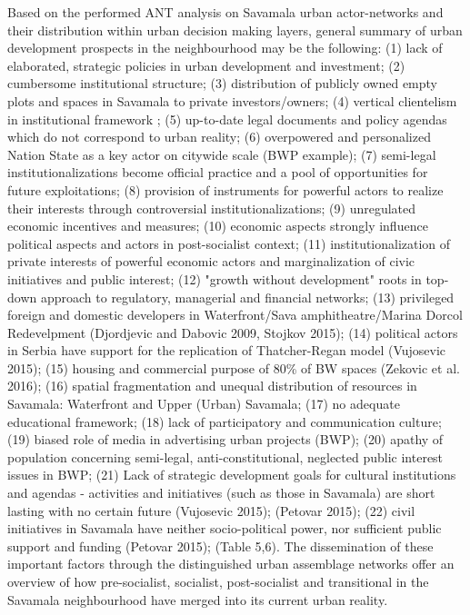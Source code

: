 \documentclass[11pt]{report}
\begin{document}
Based on the performed ANT analysis on Savamala urban actor-networks and their distribution within urban decision making layers, general summary of urban development prospects in the neighbourhood may be the following:
(1) lack of elaborated, strategic policies in urban development and investment;
(2) cumbersome institutional structure;
(3) distribution of publicly owned empty plots and spaces in Savamala to private investors/owners;
(4) vertical clientelism in institutional framework \cite{(Vujovic and Petrovic 2007)};
(5) up-to-date legal documents and policy agendas which do not correspond to urban reality;
(6) overpowered and personalized Nation State as a key actor on citywide scale (BWP example);
(7) semi-legal institutionalizations become official practice and a pool of opportunities for future exploitations;
(8) provision of instruments for powerful actors to realize their interests through controversial institutionalizations; (9) unregulated economic incentives and measures;
(10) economic aspects strongly influence political aspects and actors in post-socialist context;
(11) institutionalization of private interests of powerful economic actors and marginalization of civic initiatives and public interest;
(12) "growth without development" \cite{(Vujosevic and Maricic 2012)} roots in top-down approach to regulatory, managerial and financial networks;
(13) privileged foreign and domestic developers in Waterfront/Sava amphitheatre/Marina Dorcol Redevelpment (Djordjevic and Dabovic 2009, Stojkov 2015);
(14) political actors in Serbia have support for the replication of Thatcher-Regan model (Vujosevic 2015);
(15) housing and commercial purpose of 80\% of BW spaces (Zekovic et al. 2016); 
(16) spatial fragmentation and unequal distribution of resources in Savamala: Waterfront and Upper (Urban) Savamala; (17) no adequate educational framework;
(18) lack of participatory and communication culture;
(19) biased role of media in advertising urban projects (BWP);
(20) apathy of population concerning semi-legal, anti-constitutional, neglected public interest issues in BWP;
(21) Lack of strategic development goals for cultural institutions and agendas - activities and initiatives (such as those in Savamala) are short lasting with no certain future (Vujosevic 2015); (Petovar 2015);
(22) civil initiatives in Savamala have neither socio-political power, nor sufficient public support and funding (Petovar 2015);
(Table 5,6). 
The dissemination of these important factors through the distinguished urban assemblage networks offer an overview of how pre-socialist, socialist, post-socialist and transitional in the Savamala neighbourhood have merged into its current urban reality.
\end{document}

